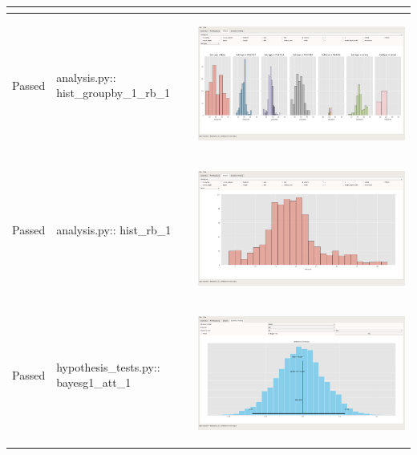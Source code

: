 \documentclass[11pt]{report}
\begin{document}
\begin{longtable}{|l|p{4.4cm}|C|}
\begin{center}
\end{center}\\
\hline
\color{ForestGreen}Passed & analysis.py:: hist\_groupby\_1\_rb\_1 & \begin{center}
\includegraphics[width=.9\linewidth]{./images/Screenshots/analysis_window_hist_groupby_1_rb_1.png}
\end{center}\\
\hline
\color{ForestGreen}Passed & analysis.py:: hist\_rb\_1 & \begin{center}
\includegraphics[width=.9\linewidth]{./images/Screenshots/analysis_window_hist_rb_1.png}
\end{center}\\
\hline
\color{ForestGreen}Passed & hypothesis\_tests.py:: bayesg1\_att\_1 & \begin{center}
\includegraphics[width=.9\linewidth]{./images/Screenshots/hypothesis_bayestest_g1_att_1.png}

\end{center}
\end{longtable}
\end{document}
